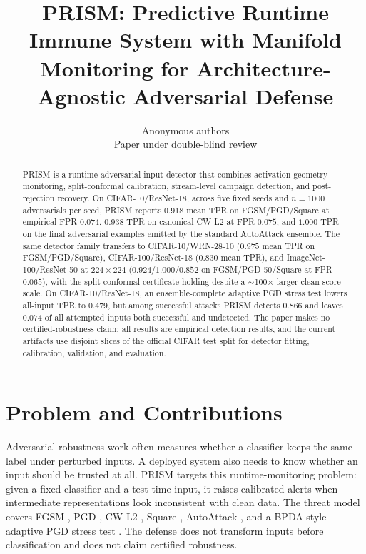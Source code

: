 \documentclass{article}
\title{\textsc{PRISM}: Predictive Runtime Immune System with Manifold Monitoring for Architecture-Agnostic Adversarial Defense}
\author{Anonymous authors\\Paper under double-blind review}
\newcommand{\prism}{\textsc{PRISM}\xspace}
\begin{document}
\maketitle

\begin{abstract}
\prism is a runtime adversarial-input detector that combines activation-geometry monitoring, split-conformal calibration, stream-level campaign detection, and post-rejection recovery. On CIFAR-10/ResNet-18, across five fixed seeds and $n=1000$ adversarials per seed, \prism reports $0.918$ mean TPR on FGSM/PGD/Square at empirical FPR $0.074$, $0.938$ TPR on canonical CW-L2 at FPR $0.075$, and $1.000$ TPR on the final adversarial examples emitted by the standard AutoAttack ensemble. The same detector family transfers to CIFAR-10/WRN-28-10 ($0.975$ mean TPR on FGSM/PGD/Square), CIFAR-100/ResNet-18 ($0.830$ mean TPR), and ImageNet-100/ResNet-50 at $224\times224$ ($0.924/1.000/0.852$ on FGSM/PGD-50/Square at FPR $0.065$), with the split-conformal certificate holding despite a $\sim$100$\times$ larger clean score scale. On CIFAR-10/ResNet-18, an ensemble-complete adaptive PGD stress test lowers all-input TPR to $0.479$, but among successful attacks \prism detects $0.866$ and leaves $0.074$ of all attempted inputs both successful and undetected. The paper makes no certified-robustness claim: all results are empirical detection results, and the current artifacts use disjoint slices of the official CIFAR test split for detector fitting, calibration, validation, and evaluation.
\end{abstract}

\section{Problem and Contributions}
Adversarial robustness work often measures whether a classifier keeps the same label under perturbed inputs. A deployed system also needs to know whether an input should be trusted at all. \prism targets this runtime-monitoring problem: given a fixed classifier and a test-time input, it raises calibrated alerts when intermediate representations look inconsistent with clean data. The threat model covers FGSM \citep{goodfellow2015explaining}, PGD \citep{madry2017towards}, CW-L2 \citep{carlini2017adversarial}, Square \citep{andriushchenko2020square}, AutoAttack \citep{croce2020reliable}, and a BPDA-style adaptive PGD stress test \citep{athalye2018obfuscated,carlini2019evaluating}. The defense does not transform inputs before classification and does not claim certified robustness.
\end{document}
